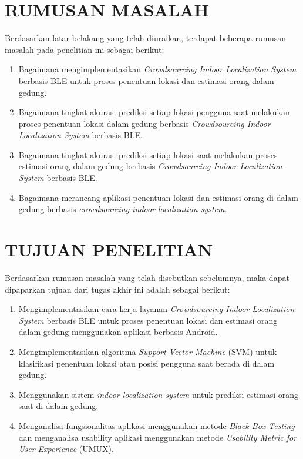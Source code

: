 \section{\uppercase{RUMUSAN MASALAH}}
Berdasarkan latar belakang yang telah diuraikan, terdapat beberapa rumusan masalah pada penelitian ini sebagai berikut:
\begin{enumerate}
	\item Bagaimana mengimplementasikan \textit{Crowdsourcing Indoor Localization System} berbasis BLE untuk proses penentuan lokasi dan estimasi orang dalam gedung.
	\item Bagaimana tingkat akurasi prediksi setiap lokasi pengguna saat melakukan proses  penentuan lokasi dalam gedung berbasis \textit{Crowdsourcing Indoor Localization System} berbasis BLE.	      %
	\item Bagaimana tingkat akurasi prediksi setiap lokasi saat melakukan proses estimasi orang dalam gedung berbasis \textit{Crowdsourcing Indoor Localization System} berbasis BLE.
	\item Bagaimana merancang aplikasi penentuan lokasi dan estimasi orang di dalam gedung berbasis \textit{crowdsourcing indoor localization system}.

\end{enumerate}

\section{\uppercase{TUJUAN PENELITIAN}}
Berdasarkan rumusan masalah yang telah disebutkan sebelumnya, maka dapat dipaparkan tujuan dari tugas akhir ini adalah sebagai berikut:
\begin{enumerate}
	\item Mengimplementasikan cara kerja layanan \textit{Crowdsourcing Indoor Localization System} berbasis BLE untuk proses penentuan lokasi dan estimasi orang dalam gedung menggunakan aplikasi berbasis Android.
	\item Mengimplementasikan algoritma \textit{\textit{Support Vector Machine}} (SVM) untuk klasifikasi penentuan lokasi atau posisi pengguna saat berada  di dalam gedung.
	\item Menggunakan sistem \textit{indoor localization system} untuk prediksi estimasi orang saat di dalam gedung.
	\item Menganalisa fungsionalitas aplikasi menggunakan metode \textit{Black Box Testing} dan menganalisa usability aplikasi menggunakan metode \textit{Usability Metric for User Experience} (UMUX).
\end{enumerate}


